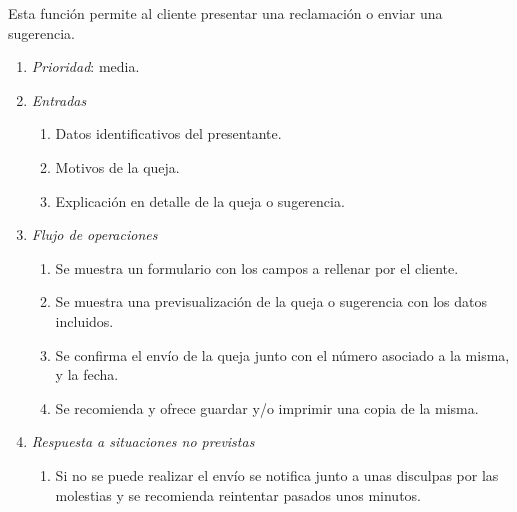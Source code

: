 	Esta función permite al cliente presentar una reclamación o enviar una sugerencia.

\begin{enumerate}
	\item \textit{Prioridad}: media.
	\item \textit{Entradas}
	\begin{enumerate}
		\item Datos identificativos del presentante.
		\item Motivos de la queja.
		\item Explicación en detalle de la queja o sugerencia.
	\end{enumerate}
	\item \textit{Flujo de operaciones}
	\begin{enumerate}
		\item Se muestra un formulario con los campos a rellenar por el cliente.
		\item Se muestra una previsualización de la queja o sugerencia con los datos incluidos.
		\item Se confirma el envío de la queja junto con el número asociado a la misma, y la fecha.
		\item Se recomienda y ofrece guardar y/o imprimir una copia de la misma.
	\end{enumerate}
	\item \textit{Respuesta a situaciones no previstas}
	\begin{enumerate}
		\item Si no se puede realizar el envío se notifica junto a unas disculpas por las molestias y se recomienda reintentar pasados unos minutos.
	\end{enumerate}
\end{enumerate}
